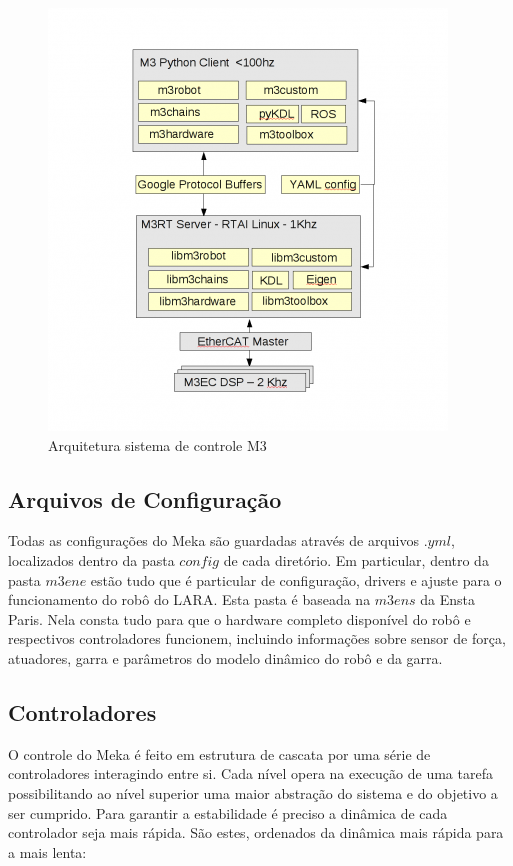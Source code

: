 \begin{figure}[H]
    \centering
    \includegraphics[width=0.7\linewidth]{tex/figs/m3arch.png}
    \caption{Arquitetura sistema de controle M3 \cite{mekaguide}}
    \label{fig:m3arch}
\end{figure}

\subsection{Arquivos de Configuração}

Todas as configurações do Meka são guardadas através de arquivos $.yml$, localizados dentro da pasta $config$ de cada diretório. Em particular, dentro da pasta $m3ene$ estão tudo que é particular de configuração, drivers e ajuste para o funcionamento do robô do LARA. Esta pasta é baseada na $m3ens$ da Ensta Paris. Nela consta tudo para que o hardware completo disponível do robô e respectivos controladores funcionem, incluindo informações sobre sensor de força, atuadores, garra e parâmetros do modelo dinâmico do robô e da garra.

\subsection{Controladores}

O controle do Meka é feito em estrutura de cascata por uma série de controladores interagindo entre si. Cada nível opera na execução de uma tarefa possibilitando ao nível superior uma maior abstração do sistema e do objetivo a ser cumprido. Para garantir a estabilidade é preciso a dinâmica de cada controlador seja mais rápida. São estes, ordenados da dinâmica mais rápida para a mais lenta:

